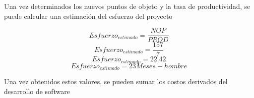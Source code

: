 Una vez determinados los nuevos puntos de objeto y la tasa de productividad, se puede calcular una estimación del esfuerzo del proyecto 

\[ Esfuerzo_{estimado} = \frac{NOP}{PROD}\]
\[ Esfuerzo_{estimado} = \frac{157}{7}\]
\[ Esfuerzo_{estimado} = 22.42\]
\[ Esfuerzo_{estimado} = 23 Meses-hombre\]

Una vez obtenidos estos valores, se pueden sumar los costos derivados del desarrollo de software 



